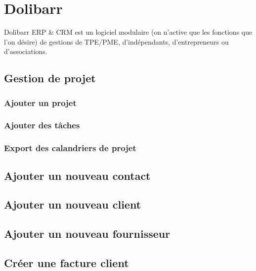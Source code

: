 \documentclass[a4paper]{article}
\begin{document}
\section[Dolibarr, logiciel de gestion]{Dolibarr}
\label{sec:Dolibarr}
Dolibarr ERP \& CRM est un logiciel modulaire (on n'active que les
fonctions que l'on désire) de gestions de TPE/PME, d'indépendants,
d'entrepreneurs ou d'associations.

\subsection{Gestion de projet}
\label{sec:DolibarrGestionProjet}

\subsubsection{Ajouter un projet}
\label{sec:DolibarrAjouterProjet}

\subsubsection{Ajouter des tâches}
\label{sec:DolibarrAjouterTaches}

\subsubsection{Export des calandriers de projet}
\label{sec:DolibarrExportCalendrierProjet}


\subsection{Ajouter un nouveau contact}
\label{sec:DolibarrAjouterNouveauContact}

\subsection{Ajouter un nouveau client}
\label{sec:DolibarrAjouterNouveauClient}

\subsection{Ajouter un nouveau fournisseur}
\label{sec:DolibarrAjouterNouveauFournisseur}

\subsection{Créer une facture client}
\label{sec:DolibarrFactureClient}
\end{document}
